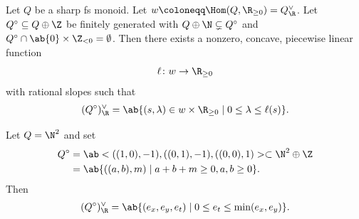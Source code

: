 \begin{lem}
    Let \(Q\) be a sharp fs monoid. Let \(w \coloneqq \Hom(Q, \R_{\geq 0}) = Q_{\R}^{\vee}\). Let \(Q^{\circ} \subseteq Q \oplus \Z\) be finitely generated with \(Q \oplus \N \subsetneq Q^{\circ}\) and \(Q^{\circ} \cap \ab\{0\} \times \Z_{<0} = \emptyset\). Then there exists a nonzero, concave, piecewise linear function
    \[ \ell \colon w \to \R_{\geq 0} \]
    with rational slopes such that
    \[ (Q^{\circ})_{\R}^{\vee} = \ab\{ (s, \lambda) \in w \times \R_{\geq 0} \mid 0 \leq \lambda \leq \ell(s) \}. \]
\end{lem}

\begin{exm}
    Let \(Q = \N^2\) and set 
    \begin{align*}
        Q^{\circ} &= \ab<((1,0), -1), ((0,1), -1), ((0,0),1)> \subset \N^2 \oplus \Z \\
        &= \ab\{((a,b), m) \mid a+b+m \geq 0, a,b \geq 0 \}.
    \end{align*}
    Then
    \[ (Q^{\circ})_{\R}^{\vee} = \ab\{ (e_x, e_y, e_t) \mid 0 \leq e_t \leq \min(e_x, e_y) \}. \]
\end{exm}





